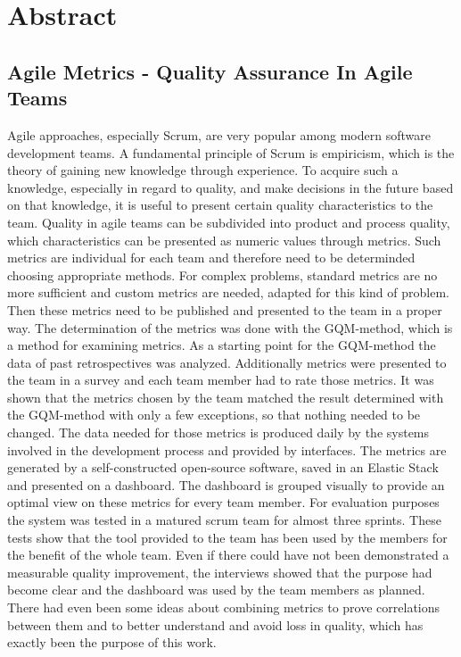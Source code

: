 \newpage
\chapter*{Abstract}
\section*{Agile Metrics {-} Quality Assurance In Agile Teams}

Agile approaches, especially Scrum, are very popular among modern software development teams.
A fundamental principle of Scrum is empiricism, which is the theory of gaining new knowledge through experience.
To acquire such a knowledge, especially in regard to quality, and make decisions in the future based on that knowledge, it is useful to present certain quality characteristics to the team.
Quality in agile teams can be subdivided into product and process quality, which characteristics can be presented as numeric values through metrics.
Such metrics are individual for each team and therefore need to be determinded choosing appropriate methods.
For complex problems, standard metrics are no more sufficient and custom metrics are needed, adapted for this kind of problem.
Then these metrics need to be published and presented to the team in a proper way.
The determination of the metrics was done with the \ac{GQM}-method, which is a method for examining metrics.
As a starting point for the \ac{GQM}-method the data of past retrospectives was analyzed.
Additionally metrics were presented to the team in a survey and each team member had to rate those metrics.
It was shown that the metrics chosen by the team matched the result determined with the \ac{GQM}-method with only a few exceptions, so that nothing needed to be changed.
The data needed for those metrics is produced daily by the systems involved in the development process and provided by interfaces.
The metrics are generated by a self-constructed open-source software, saved in an Elastic Stack and presented on a dashboard.
The dashboard is grouped visually to provide an optimal view on these metrics for every team member.
For evaluation purposes the system was tested in a matured scrum team for almost three sprints.
These tests show that the tool provided to the team has been used by the members for the benefit of the whole team.
Even if there could have not been demonstrated a measurable quality improvement, the interviews showed that the purpose had become clear and the dashboard was used by the team members as planned.
There had even been some ideas about combining metrics to prove correlations between them and to better understand and avoid loss in quality, which has exactly been the purpose of this work.
